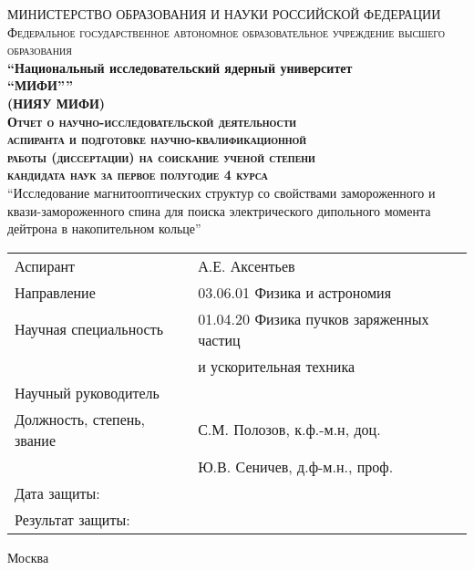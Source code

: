 \begin{titlepage}

\begin{center}
{МИНИСТЕРСТВО ОБРАЗОВАНИЯ И НАУКИ РОССИЙСКОЙ ФЕДЕРАЦИИ}\\[3pt]
\textsc{\small{Федеральное государственное автономное образовательное учреждение высшего образования}}\\

\textbf{\enquote{Национальный исследовательский ядерный университет\\
{``МИФИ''}}}\\
\textbf{(НИЯУ МИФИ)}\\[2cm]




\textsc{\textbf{Отчет о научно-исследовательской деятельности\\		
		аспиранта и подготовке научно-квалификационной\\	
		работы (диссертации) на соискание ученой степени\\		
		кандидата наук за первое полугодие 4 курса}}\\[2cm]

\enquote{Исследование магнитооптических структур со свойствами замороженного и квази-замороженного спина для поиска электрического дипольного момента дейтрона в накопительном кольце}\\[2cm]


\end{center}


\begin{flushleft}
\begin{tabular}{ll}
	Аспирант                   & А.Е. Аксентьев                           \\
	Направление                & 03.06.01 Физика и астрономия             \\
	Научная специальность      & 01.04.20 Физика пучков заряженных частиц \\
	                           & \-\hspace{1.8cm} и ускорительная техника \\[1cm]
	Научный руководитель       &                                          \\
	Должность, степень, звание & С.М. Полозов, к.ф.-м.н, доц.             \\%
	                           & Ю.В. Сеничев, д.ф-м.н., проф.            \\[1cm]
	Дата защиты:               &                                          \\
	Результат защиты:          &
\end{tabular}

\end{flushleft}

\vfill


\begin{center}
Москва \the\year{}
\end{center}



\end{titlepage}
